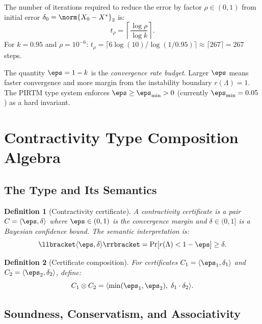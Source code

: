 \documentclass[11pt,letterpaper]{article}
\theoremstyle{pirtmthm}
\newtheorem{definition}{Definition}[section]
\theoremstyle{remark}
\begin{document}
\begin{corollary}
\label{cor:convergence-speed}
The number of iterations required to reduce the error by factor
$\rho \in (0,1)$ from initial error $\delta_0 = \norm{X_0 - X^*}_2$
is:
\[
  t_\rho = \left\lceil \frac{\log \rho}{\log k} \right\rceil.
\]
For $k = 0.95$ and $\rho = 10^{-6}$:
$t_\rho = \lceil 6\log(10) / \log(1/0.95) \rceil \approx \lceil 267 \rceil = 267$ steps.
\end{corollary}

\begin{corollary}
\label{cor:eps-budget}
The quantity $\eps = 1 - k$ is the \emph{convergence rate budget}.
Larger $\eps$ means faster convergence and more margin from the
instability boundary $r(\Lambda) = 1$.
The PIRTM type system enforces $\eps \geq \eps_{\min} > 0$ (currently
$\eps_{\min} = 0.05$) as a hard invariant.
\end{corollary}

\section{Contractivity Type Composition Algebra}
\label{sec:composition}

\subsection{The Type and Its Semantics}

\begin{definition}[Contractivity certificate]
\label{def:A-cert}
A \emph{contractivity certificate} is a pair $C = \langle\eps, \delta\rangle$
where $\eps \in (0,1)$ is the convergence margin and $\delta \in (0,1]$
is a Bayesian confidence bound. The semantic interpretation is:
\[
  \llbracket\langle\eps,\delta\rangle\rrbracket
  = \Pr\!\left[ r(\Lambda) < 1 - \eps \right] \geq \delta.
\]
\end{definition}

\begin{definition}[Certificate composition]
\label{def:A-compose}
For certificates $C_1 = \langle\eps_1,\delta_1\rangle$ and
$C_2 = \langle\eps_2,\delta_2\rangle$, define:
\[
  C_1 \otimes C_2 = \langle \min(\eps_1,\eps_2),\; \delta_1 \cdot \delta_2 \rangle.
\]
\end{definition}

\subsection{Soundness, Conservatism, and Associativity}
\end{document}
